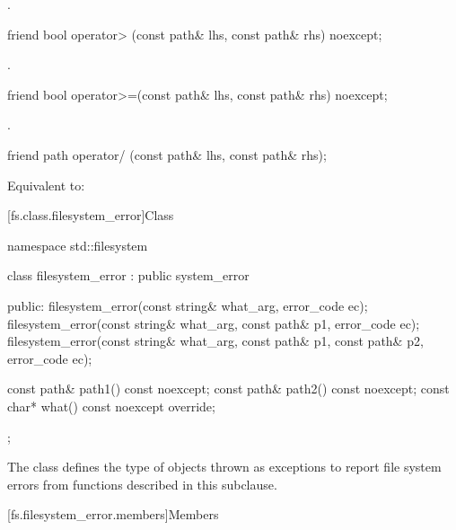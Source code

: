 \begin{itemdescr}
\pnum
\returns {}.
\end{itemdescr}

%
\begin{itemdecl}
friend bool operator> (const path& lhs, const path& rhs) noexcept;
\end{itemdecl}

\begin{itemdescr}
\pnum
\returns {}.
\end{itemdescr}

%
\begin{itemdecl}
friend bool operator>=(const path& lhs, const path& rhs) noexcept;
\end{itemdecl}

\begin{itemdescr}
\pnum
\returns {}.
\end{itemdescr}

%
\begin{itemdecl}
friend path operator/ (const path& lhs, const path& rhs);
\end{itemdecl}

\begin{itemdescr}
\pnum
\effects Equivalent to: 
\end{itemdescr}

[fs.class.filesystem_error]{Class }

%
\begin{codeblock}
namespace std::filesystem {
  class filesystem_error : public system_error {
  public:
    filesystem_error(const string& what_arg, error_code ec);
    filesystem_error(const string& what_arg,
                     const path& p1, error_code ec);
    filesystem_error(const string& what_arg,
                     const path& p1, const path& p2, error_code ec);

    const path& path1() const noexcept;
    const path& path2() const noexcept;
    const char* what() const noexcept override;
  };
}
\end{codeblock}
\pnum
The class  defines the type of
objects thrown as exceptions to report file system errors from functions described in this
subclause.

[fs.filesystem_error.members]{Members}


